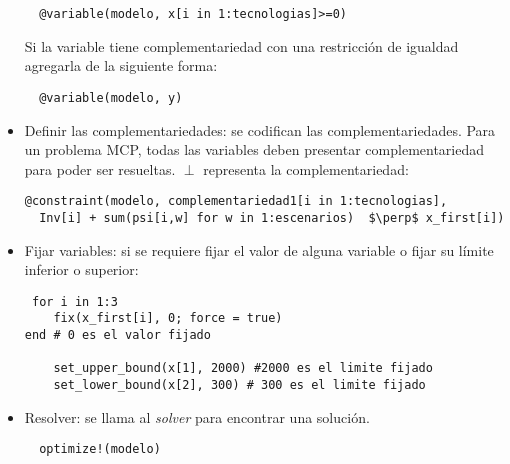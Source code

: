 \begin{itemize}
   \begin{footnotesize}
   \begin{lstlisting}
  @variable(modelo, x[i in 1:tecnologias]>=0)
   \end{lstlisting}
   \end{footnotesize}
   Si la variable tiene complementariedad con una restricción de igualdad agregarla de la siguiente forma:
   \begin{footnotesize}
   \begin{lstlisting}
  @variable(modelo, y)
   \end{lstlisting}
   \end{footnotesize}
   
  
  \item Definir las complementariedades: se codifican las complementariedades. Para un problema MCP, todas las variables deben presentar complementariedad para poder ser resueltas. $\perp$ representa la complementariedad:
  
  \begin{footnotesize}
  \begin{lstlisting}[mathescape=true]
  @constraint(modelo, complementariedad1[i in 1:tecnologias],  
  Inv[i] + sum(psi[i,w] for w in 1:escenarios)  $\perp$ x_first[i])
  \end{lstlisting}
  \end{footnotesize}
  
  \item Fijar variables: si se requiere fijar el valor de alguna variable o fijar su límite inferior o superior:
  
  \begin{footnotesize}
  \begin{lstlisting}
 for i in 1:3
    fix(x_first[i], 0; force = true) 
end # 0 es el valor fijado
    
    set_upper_bound(x[1], 2000) #2000 es el limite fijado
    set_lower_bound(x[2], 300) # 300 es el limite fijado
  \end{lstlisting}
  \end{footnotesize}
  
  
  \item  Resolver: se llama al \textit{solver} para encontrar una solución.
  
  \begin{footnotesize}
   \begin{lstlisting}
  optimize!(modelo)
  \end{lstlisting}
  \end{footnotesize}
 
\end{itemize}

